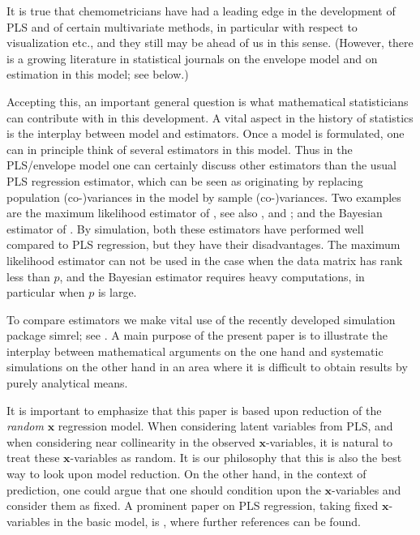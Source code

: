 \documentclass[a4paper, 11pt]{article}
\begin{document}
It is true that chemometricians have had a leading edge in the development of PLS and of certain multivariate methods, in particular with respect to visualization etc., and they still may be ahead of us in this sense. (However, there is a growing literature in statistical journals on the envelope model and on estimation in this model; see below.)

Accepting this, an important general question is what mathematical statisticians can contribute with in this development. A vital aspect in the history of statistics is the interplay between model and estimators. Once a model is formulated, one can in principle think of several estimators in this model. Thus in the PLS/envelope model one can certainly discuss other estimators than the usual PLS regression estimator, which can be seen as originating by replacing population (co-)variances in the model by sample (co-)variances. Two examples are the maximum likelihood estimator of \citet{cook2013envelopes}, see also \citet{cook2015envlp}, \citet{cook2016note} and \citet{cook2016algorithms}; and the Bayesian estimator of \citet{helland2012near}. By simulation, both these estimators have performed well compared to PLS regression, but they have their disadvantages. The maximum likelihood estimator can not be used in the case when the data matrix has rank less than $p$, and the Bayesian estimator requires heavy computations, in particular when $p$ is large.

To compare estimators we make vital use of the recently developed simulation package simrel; see \citet{saebo2015simrel}. A main purpose of the present paper is to illustrate the interplay between mathematical arguments on the one hand and systematic simulations on the other hand in an area where it is difficult to obtain results by purely analytical means.

It is important to emphasize that this paper is based upon reduction of the \emph{random} $\bm{x}$ regression model. When considering latent variables from PLS, and when considering near collinearity in the observed $\bm{x}$-variables, it is natural to treat these $\bm{x}$-variables as random. It is our philosophy that this is also the best way to look upon model reduction. On the other hand, in the context of prediction, one could argue that one should condition upon the $\bm{x}$-variables and consider them as fixed. A prominent paper on PLS regression, taking fixed $\bm{x}$-variables in the basic model, is \citet{kramer2012degrees}, where further references can be found.
\end{document}
